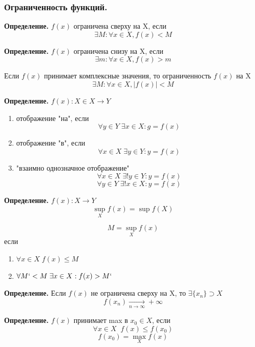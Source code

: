 \documentclass[12pt, a4paper]{article}
\begin{document}
\subsubsection{Ограниченность функций.}
\begin{tcolorbox}
	\textbf{Определение.} $f(x)$ ограничена сверху на X, если
	\[ \exists M: \forall x \in X, f(x) < M \]
\end{tcolorbox}
\begin{tcolorbox}
	\textbf{Определение.} $f(x)$ ограничена снизу на X, если
	\[ \exists m: \forall x \in X, f(x) > m \]
\end{tcolorbox}
\begin{tcolorbox}
Если $f(x)$ принимает комплексные значения, то ограниченность $f(x)$ на X
\[ \exists M: \forall x \in X, |f(x)| < M \]
\end{tcolorbox}

\begin{tcolorbox}
	\textbf{Определение.} $f(x): X \in X \to Y$
	\begin{enumerate}
		\item отображение "на", если
			\[ \forall y \in Y\; \exists x \in X: g = f(x) \]
		\item отображение "в", если
			\[ \forall x \in X\; \exists y \in Y: y = f(x) \]
		\item "взаимно однозначное отображение"
			\[ \forall x \in X\; \exists! y \in Y: y = f(x) \]
			\[ \forall y \in Y\; \exists! x \in X: y = f(x) \]
	\end{enumerate}
\end{tcolorbox}

\begin{tcolorbox}
	\textbf{Определение.} $f(x): X \to Y$
	\[ \sup_X f(x)=\sup f(X) \]
\end{tcolorbox}
\[ M = \sup_X f(x) \]
если 
\begin{enumerate}
	\item $\forall x \in X\; f(x) \leq M $
	\item $\forall M` < M\; \exists x \in X: f(x) > M` $
\end{enumerate}

\begin{tcolorbox}
	\textbf{Определение.} Если $f(x)$ не ограничена сверху на X, то $\exists \{ x_n \} \supset X $
	\[ f(x_n) \xrightarrow[n\to\infty]{} +\infty \]
\end{tcolorbox}

\begin{tcolorbox}
	\textbf{Определение.} $f(x)$ принимает max в $x_0 \in X$, если
	\[ \forall x \in X\;\; f(x) \leq f(x_0) \]
	\[ f(x_0) = \max_X f(x) \]
\end{tcolorbox}
\end{document}
